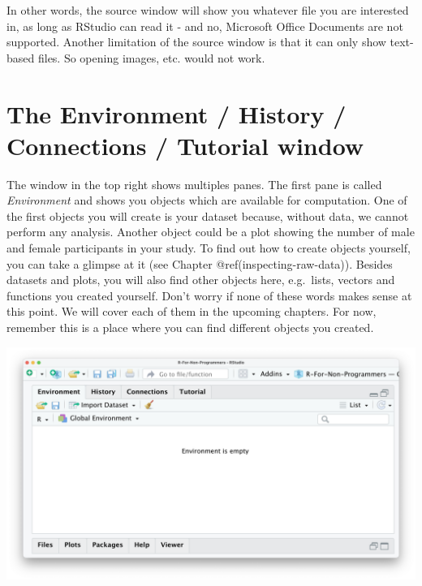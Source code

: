 \documentclass[
  letterpaper,
]{krantz}
\begin{document}
In other words, the source window will show you whatever file you are
interested in, as long as RStudio can read it - and no, Microsoft Office
Documents are not supported. Another limitation of the source window is
that it can only show text-based files. So opening images, etc. would
not work.

\section{The Environment / History / Connections / Tutorial
window}\label{sec-the-environment-history-connections-tutorial-window}

The window in the top right shows multiples panes. The first pane is
called \emph{Environment} and shows you objects which are available for
computation. One of the first objects you will create is your dataset
because, without data, we cannot perform any analysis. Another object
could be a plot showing the number of male and female participants in
your study. To find out how to create objects yourself, you can take a
glimpse at it (see Chapter @ref(inspecting-raw-data)). Besides datasets
and plots, you will also find other objects here, e.g.~lists, vectors
and functions you created yourself. Don't worry if none of these words
makes sense at this point. We will cover each of them in the upcoming
chapters. For now, remember this is a place where you can find different
objects you created.

\includegraphics{images/chapter_04_img/04_environment_history_etc/01_rstudio_environment.png}
\end{document}
